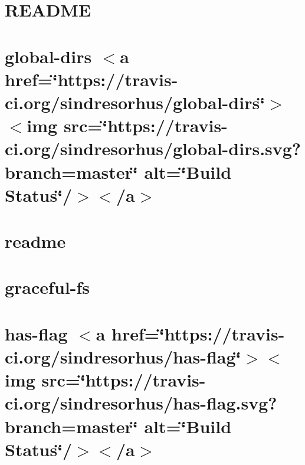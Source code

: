 \let\mypdfximage\pdfximage\def\pdfximage{\immediate\mypdfximage}\documentclass[twoside]{book}
\newcommand{\+}{\discretionary{\mbox{\scriptsize$\hookleftarrow$}}{}{}}
\begin{document}
\chapter{R\+E\+A\+D\+ME}
\label{md__c_1__git_hub__p_r_o_y_e_c_t_o-_i_i_i-_g_o_t_rest-api_node_modules_glob-parent__r_e_a_d_m_e}

\chapter{global-\/dirs $<$a href=\char`\"{}https\+://travis-\/ci.\+org/sindresorhus/global-\/dirs\char`\"{}$>$$<$img src=\char`\"{}https\+://travis-\/ci.\+org/sindresorhus/global-\/dirs.\+svg?branch=master\char`\"{} alt=\char`\"{}\+Build Status\char`\"{}/$>$$<$/a$>$}
\label{md__c_1__git_hub__p_r_o_y_e_c_t_o-_i_i_i-_g_o_t_rest-api_node_modules_global-dirs_readme}

\chapter{readme}
\label{md__c_1__git_hub__p_r_o_y_e_c_t_o-_i_i_i-_g_o_t_rest-api_node_modules_got_readme}

\chapter{graceful-\/fs}
\label{md__c_1__git_hub__p_r_o_y_e_c_t_o-_i_i_i-_g_o_t_rest-api_node_modules_graceful-fs__r_e_a_d_m_e}

\chapter{has-\/flag $<$a href=\char`\"{}https\+://travis-\/ci.\+org/sindresorhus/has-\/flag\char`\"{}$>$$<$img src=\char`\"{}https\+://travis-\/ci.\+org/sindresorhus/has-\/flag.\+svg?branch=master\char`\"{} alt=\char`\"{}\+Build Status\char`\"{}/$>$$<$/a$>$}
\label{md__c_1__git_hub__p_r_o_y_e_c_t_o-_i_i_i-_g_o_t_rest-api_node_modules_has-flag_readme}

\end{document}
